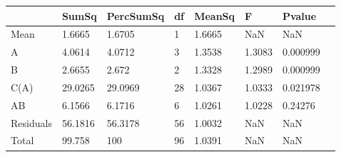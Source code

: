 \begin{table} 
\begin{tabular}{llllllll}
 & SumSq & PercSumSq & df & MeanSq & F & Pvalue \\ 
 \hline 
Mean & 1.6665 & 1.6705 & 1 & 1.6665 & NaN & NaN \\ 
A & 4.0614 & 4.0712 & 3 & 1.3538 & 1.3083 & 0.000999 \\ 
B & 2.6655 & 2.672 & 2 & 1.3328 & 1.2989 & 0.000999 \\ 
C(A) & 29.0265 & 29.0969 & 28 & 1.0367 & 1.0333 & 0.021978 \\ 
AB & 6.1566 & 6.1716 & 6 & 1.0261 & 1.0228 & 0.24276 \\ 
Residuals & 56.1816 & 56.3178 & 56 & 1.0032 & NaN & NaN \\ 
Total & 99.758 & 100 & 96 & 1.0391 & NaN & NaN \\ 
\end{tabular} 
\end{table} 
